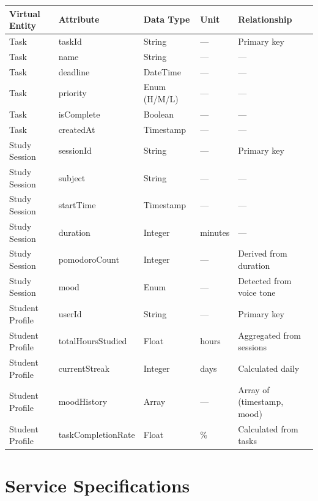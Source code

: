 \documentclass[12pt,a4paper]{article}
\begin{document}
\begin{center}
\label{tab:infomodel}
\scriptsize
\begin{tabular}{|L{0.14\textwidth}|L{0.16\textwidth}|L{0.12\textwidth}|L{0.08\textwidth}|L{0.35\textwidth}|}
\hline
\textbf{Virtual Entity} & \textbf{Attribute} & \textbf{Data Type} &
\textbf{Unit} & \textbf{Relationship} \\ \hline
Task & taskId & String & --- & Primary key \\ \hline
Task & name & String & --- & --- \\ \hline
Task & deadline & DateTime & --- & --- \\ \hline
Task & priority & Enum (H/M/L) & --- & --- \\ \hline
Task & isComplete & Boolean & --- & --- \\ \hline
Task & createdAt & Timestamp & --- & --- \\ \hline
Study Session & sessionId & String & --- & Primary key \\ \hline
Study Session & subject & String & --- & --- \\ \hline
Study Session & startTime & Timestamp & --- & --- \\ \hline
Study Session & duration & Integer & minutes & --- \\ \hline
Study Session & pomodoroCount & Integer & --- & Derived from duration \\ \hline
Study Session & mood & Enum & --- & Detected from voice tone \\ \hline
Student Profile & userId & String & --- & Primary key \\ \hline
Student Profile & totalHoursStudied & Float & hours & Aggregated from sessions \\ \hline
Student Profile & currentStreak & Integer & days & Calculated daily \\ \hline
Student Profile & moodHistory & Array & --- & Array of (timestamp, mood) \\ \hline
Student Profile & taskCompletionRate & Float & \% & Calculated from tasks \\ \hline
\end{tabular}
\end{center}

\section{Service Specifications}
\end{document}
